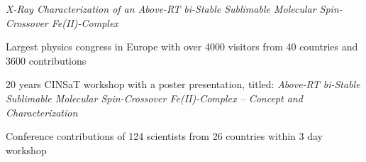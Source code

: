 \begin{adjustwidth}{2.5cm}{1.9cm}
\begin{tightemize}
\textit{X-Ray Characterization of an Above-RT bi-Stable Sublimable Molecular Spin-Crossover Fe(II)-Complex}


Largest physics congress in Europe with over 4000 visitors from 40 countries and 3600 contributions
\end{tightemize}
\begin{tightemize} \vspace{-3pt}
\item 20 years CINSaT workshop with a poster presentation, titled: \textit{Above-RT bi-Stable Sublimable Molecular Spin-Crossover
Fe(II)-Complex – Concept and Characterization}


Conference contributions of 124 scientists from 26 countries within 3 day workshop
\end{tightemize}

\end{adjustwidth}
